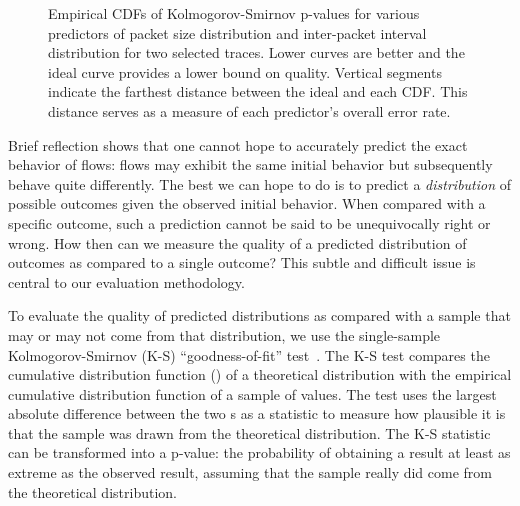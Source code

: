 \documentclass[conference]{IEEEtran}
\begin{document}
\begin{figure}[t]
\begin{center}
\caption{%
Empirical CDFs of Kolmogorov-Smirnov p-values for various predictors of packet size distribution and inter-packet interval distribution for two selected traces. Lower curves are better and the ideal curve provides a lower bound on quality.
Vertical segments indicate the farthest distance between the ideal and each CDF.
This distance serves as a measure of each predictor's overall error rate.
}
\end{center}
\vspace{-1.5em}
\end{figure}

Brief reflection shows that one cannot hope to accurately predict the exact behavior of flows:
flows may exhibit the same initial behavior but subsequently behave quite differently.
The best we can hope to do is to predict a \emph{distribution} of possible outcomes given the observed initial behavior.
When compared with a specific outcome, such a prediction cannot be said to be unequivocally right or wrong.
How then can we measure the quality of a predicted distribution of outcomes as compared to a single outcome?
This subtle and difficult issue is central to our evaluation methodology.


To evaluate the quality of predicted distributions as compared with a sample that may or may not come from that distribution, we use the single-sample Kolmogorov-Smirnov (K-S) ``goodness-of-fit'' test~\cite{Feller68}.
The K-S test compares the cumulative distribution function () of a theoretical distribution with the empirical cumulative distribution function of a sample of values.
The test uses the largest absolute difference between the two s as a statistic to measure how plausible it is that the sample was drawn from the theoretical distribution.
The K-S statistic can be transformed into a p-value:
the probability of obtaining a result at least as extreme as the observed result, assuming that the sample really did come from the theoretical distribution.
\end{document}

